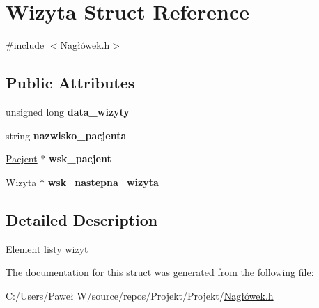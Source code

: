\hypertarget{struct_wizyta}{}\section{Wizyta Struct Reference}
\label{struct_wizyta}


{\ttfamily \#include $<$Nagłówek.\+h$>$}

\subsection*{Public Attributes}
\begin{DoxyCompactItemize}
\item 
\mbox{\label{struct_wizyta_a425994af189ad6687cb9972df366838d}} 
unsigned long {\bfseries data\+\_\+wizyty}
\item 
\mbox{\label{struct_wizyta_abb42e3bf8148f1e76f8d6f900039dbb2}} 
string {\bfseries nazwisko\+\_\+pacjenta}
\item 
\mbox{\label{struct_wizyta_a641be72e176f80307eca1188cd71d262}} 
\mbox{\hyperlink{struct_pacjent}{Pacjent}} $\ast$ {\bfseries wsk\+\_\+pacjent}
\item 
\mbox{\label{struct_wizyta_a32b798573fcebabc957d434d47a643c3}} 
\mbox{\hyperlink{struct_wizyta}{Wizyta}} $\ast$ {\bfseries wsk\+\_\+nastepna\+\_\+wizyta}
\end{DoxyCompactItemize}


\subsection{Detailed Description}
Element listy wizyt 

The documentation for this struct was generated from the following file\+:\begin{DoxyCompactItemize}
\item 
C\+:/\+Users/\+Paweł W/source/repos/\+Projekt/\+Projekt/\mbox{\hyperlink{_nag_xC5_x82_xC3_xB3wek_8h}{Nagłówek.\+h}}\end{DoxyCompactItemize}
